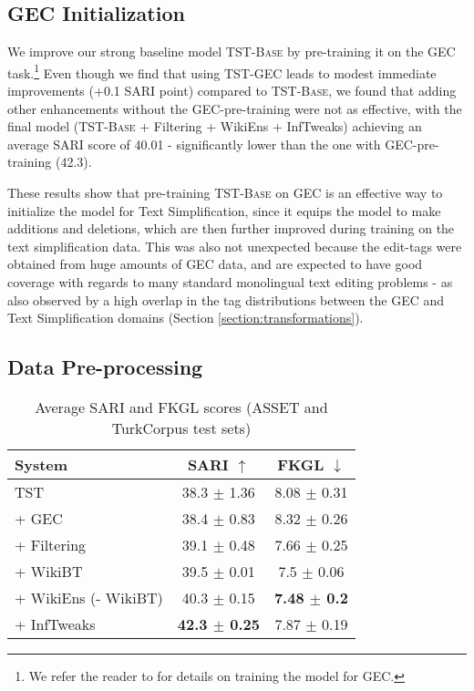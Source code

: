 \documentclass[11pt,a4paper]{article}
\begin{document}
\subsection{GEC Initialization}
\label{ssec:ablation_gec}
We improve our strong baseline model \textsc{TST-Base} by pre-training it on the GEC task.\footnote{We refer the reader to \citet{omelianchuk-etal-2020-gector} for details on training the model for GEC.} Even though we find that using \textsc{TST-GEC}
leads to modest immediate improvements (+0.1 SARI point) compared to \textsc{TST-Base}, we found that adding other enhancements without the GEC-pre-training were not as effective, with the final model (\textsc{TST-Base} + Filtering + WikiEns + InfTweaks) achieving an average SARI score of 40.01 - significantly lower than the one with GEC-pre-training (42.3). 

These results show that pre-training \textsc{TST-Base} on GEC is an effective way to initialize the model for Text Simplification, since it equips the model to make additions and deletions, which are then further improved during training on the text simplification data. This was also not unexpected because the edit-tags were obtained from huge amounts of GEC data, and are expected to have good coverage with regards to many standard monolingual text editing problems - as also observed by a high overlap in the tag distributions between the GEC and Text Simplification domains (Section \ref{section:transformations}). 


\subsection{Data Pre-processing}
\label{ssec:ablation_brackets}

\begin{table}
    \begin{center}
    \small
    \begin{tabular}{lcc}
        \toprule
        \textbf{System} & \textbf{SARI} $\uparrow$ & \textbf{FKGL} $\downarrow$ \\
        \toprule
        TST & 38.3  $\pm$ 1.36 & 8.08 $\pm$ 0.31 \\
        \hspace{5pt} + GEC  & 38.4 $\pm$ 0.83 & 8.32 $\pm$ 0.26 \\
        \hspace{5pt} + Filtering  & 39.1 $\pm$ 0.48 & 7.66 $\pm$ 0.25 \\
        \hspace{5pt} + WikiBT & 39.5 $\pm$ 0.01 & 7.5 $\pm$ 0.06 \\
        \hspace{5pt} + WikiEns (- WikiBT) & 40.3 $\pm$ 0.15 & \textbf{7.48 $\pm$ 0.2} \\
        \hspace{5pt} + InfTweaks & \textbf{42.3 $\pm$ 0.25} & 7.87 $\pm$ 0.19 \\
        \bottomrule
    \end{tabular}
    \caption{Average SARI and FKGL scores (ASSET and TurkCorpus test sets)}
    \label{tab:sari-ablation}
\end{center}
\end{table}
\end{document}
